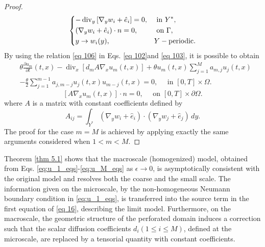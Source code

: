\begin{proof}
\begin{equation}
 \begin{dcases}
-\operatorname{div}_{y}\left[\nabla_{y} w_{i}+\hat{e}_{i}\right]=0, & \text { in } Y^{*}, \\
\left(\nabla_{y} w_{i}+\hat{e}_{i}\right) \cdot n=0, & \text { on } \Gamma, \\
y \rightarrow w_{i}(y), & Y-\text {periodic}. 
\end{dcases}
\label{eq 107}\end{equation}
By using the relation \eqref{eq 106} in Eqs. \eqref{eq 102}and \eqref{eq 103}, it is possible to obtain
\begin{equation}
 \begin{aligned}
&\theta \frac{\partial u_{m}}{\partial t}(t, x)-\operatorname{div}_{x}\left[d_{m} A \nabla_{x} u_{m}(t, x)\right]+\theta u_{m}(t, x) \sum_{j=1}^{M} a_{m, j} u_{j}(t, x) \\
&-\frac{\theta}{2} \sum_{j=1}^{m-1} a_{j, m-j} u_{j}(t, x) u_{m-j}(t, x)=0, \quad \text { in }[0, T] \times \Omega. \end{aligned}
\label{eq 108}\end{equation}
\begin{equation}
 \left[A \nabla_{x} u_{m}(t, x)\right] \cdot n=0, \quad \text { on }[0, T] \times \partial \Omega.
\label{eq 109}\end{equation}
where $A$ is a matrix with constant coefficients defined by
$$
A_{i j}=\int_{Y^{*}}\left(\nabla_{y} w_{i}+\hat{e}_{i}\right) \cdot\left(\nabla_{y} w_{j}+\hat{e}_{j}\right) \, d  y .
$$
The proof for the case $m=M$ is achieved by applying exactly the same arguments considered when $1<m<M$.
\end{proof}
Theorem \eqref{thm 5.1} shows that the macroscale (homogenized) model, obtained from Eqs. \eqref{eq:u_1_eqs}-\eqref{eq:u_M_eqs} as $\epsilon \rightarrow 0$, is asymptotically consistent with the original model and resolves both the coarse and the small scale. The information given on the microscale, by the non-homogeneous Neumann boundary condition in \eqref{eq:u_1_eqs}, is transferred into the source term in the first equation of \eqref{eq 16}, describing the limit model. Furthermore, on the macroscale, the geometric structure of the perforated domain induces a correction such that the scalar diffusion coefficients $d_{i}(1 \leq i \leq M)$, defined at the microscale, are replaced by a tensorial quantity with constant coefficients.
